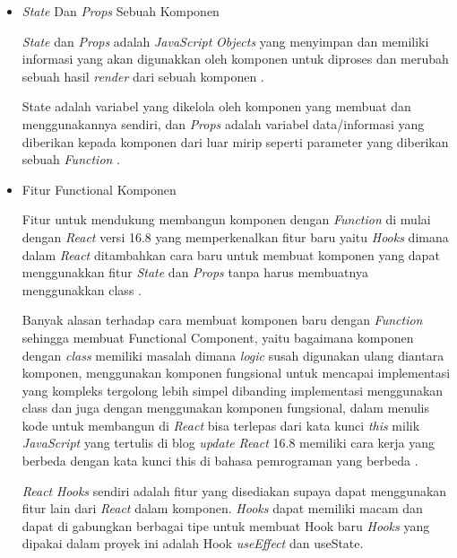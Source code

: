 \documentclass[a4paper]{article}
\begin{document}
\begin{enumerate}[label=\alph*. ]
\begin{enumerate}
\begin{itemize}
                        \item \textit{State} Dan \textit{Props} Sebuah Komponen

                        \textit{State} dan \textit{Props} adalah \textit{JavaScript} \textit{Objects} yang menyimpan dan memiliki informasi yang akan digunakkan oleh komponen untuk diproses dan merubah sebuah hasil \textit{render} dari sebuah komponen \autocite{React_state_props}.

                        State adalah variabel yang dikelola oleh komponen yang membuat dan menggunakannya sendiri, dan \textit{Props} adalah variabel data/informasi yang diberikan kepada komponen dari luar mirip seperti parameter yang diberikan sebuah \textit{Function} \autocite{React_state_props}.

                        \item Fitur Functional Komponen

                        Fitur untuk mendukung membangun komponen dengan \textit{Function} di mulai dengan \textit{React} versi 16.8 yang memperkenalkan fitur baru yaitu \textit{Hooks} dimana dalam \textit{React} ditambahkan cara baru untuk membuat komponen yang dapat menggunakkan fitur \textit{State} dan \textit{Props} tanpa harus membuatnya menggunakkan class \autocite{React_functional_components_hooks}.

                        Banyak alasan terhadap cara membuat komponen baru dengan \textit{Function} sehingga membuat Functional Component, yaitu bagaimana komponen dengan \textit{class} memiliki masalah dimana \textit{logic} susah digunakan ulang diantara komponen, menggunakan komponen fungsional untuk mencapai implementasi yang kompleks tergolong lebih simpel dibanding implementasi menggunakan class dan juga dengan menggunakan komponen fungsional, dalam menulis kode untuk membangun di \textit{React} bisa terlepas dari kata kunci \textit{this} milik \textit{JavaScript} yang tertulis di blog \textit{update} \textit{React} 16.8 memiliki cara kerja yang berbeda dengan kata kunci this di bahasa pemrograman yang berbeda \autocite{React_functional_components_hooks}.

                        \textit{React} \textit{Hooks} sendiri adalah fitur yang disediakan supaya dapat menggunakan fitur lain dari \textit{React} dalam komponen. \textit{Hooks} dapat memiliki macam dan dapat di gabungkan berbagai tipe untuk membuat Hook baru \autocite{React_general_hooks} \textit{Hooks} yang dipakai dalam proyek ini adalah Hook \textit{useEffect} dan useState.


\end{itemize}
\end{enumerate}
\end{enumerate}
\end{document}
